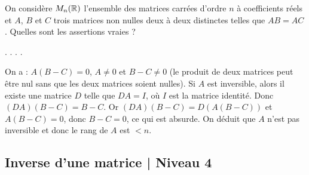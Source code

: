 \begin{question}
On considère $ M_n(\mathbb{R})$ l'ensemble des matrices carrées d'ordre $n$ à coefficients réels et $A$, $B$ et $C$ trois matrices non nulles deux à deux distinctes telles que $AB=AC$. Quelles sont les assertions vraies ?
\begin{answers}  
.
.
.
.
\end{answers}
\begin{explanations} On a : $A(B-C)=0$, $A \neq 0$ et $B-C\neq 0$ (le produit de deux matrices peut être nul sans que les 
deux matrices soient nulles).
\vskip0mm
Si $A$ est inversible, alors il existe une matrice $D$ telle que $DA=I$, où $I$ est la matrice identité. Donc  $(DA)(B-C) =B-C$. Or $(DA)(B-C)=D(A(B-C))$ et $A(B-C)=0$, donc $B-C=0$, ce qui est absurde. On déduit que $A$ n'est pas inversible et donc le rang de $A$ est $<n$.
\end{explanations}
\end{question}

\subsection{Inverse d'une matrice | Niveau 4}

